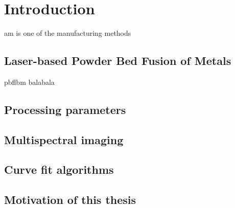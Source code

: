 \glsresetall%
\chapter{Introduction}%
\gls{am} is one of the manufacturing methods

%
%
\section{Laser-based Powder Bed Fusion of Metals}%
\gls{pbflbm} balabala
%
%
\section{Processing parameters}

\section{Multispectral imaging}

\section{Curve fit algorithms}

\section{Motivation of this thesis}